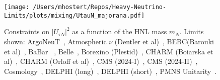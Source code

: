 \documentclass{revtex4-1}%
\begin{document}
%


\begin{figure}[h!]%
\centering%
\texttt{[image: /Users/mhostert/Repos/Heavy-Neutrino-Limits/plots/mixing/UtauN\_majorana.pdf]}%
\caption{Constraints on $|U_{\tau N}|^2$ as a function of the HNL mass $m_N$. Limits shown: ArgoNeuT~\cite{ArgoNeuT:2021clc}, Atmospheric $\nu$ (Dentler et al)~\cite{Dentler:2018sju}, BEBC(Barouki et al)~\cite{Barouki:2022bkt}, BaBar ~\cite{BaBar:2022cqj}, Belle~\cite{Belle:2024wyk}, Borexino (Plestid)~\cite{Plestid:2020ssy}, CHARM (Boiarska et al)~\cite{Boiarska:2021yho}, CHARM (Orloff et al)~\cite{Orloff:2002de}, CMS (2024-I)~\cite{CMS:2024ake}, CMS (2024-II)~\cite{CMS:2024xdq}, Cosmology~\cite{Sabti:2020yrt}, DELPHI (long)~\cite{DELPHI:1996qcc}, DELPHI (short)~\cite{DELPHI:1996qcc}, PMNS Unitarity~\cite{Blennow:2023mqx}.}%
\end{figure}

%
%
%
\end{document}
